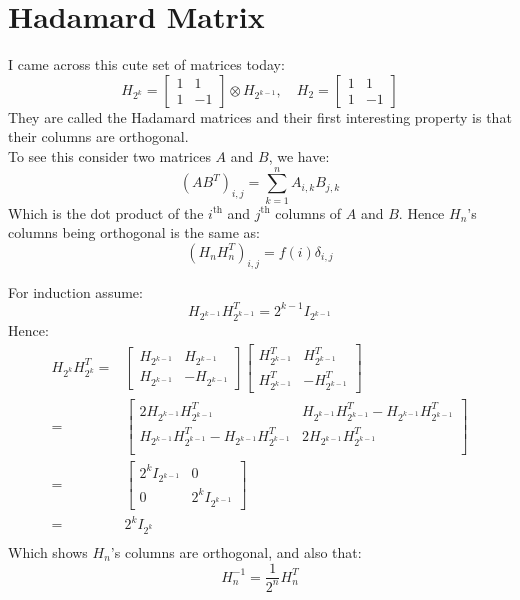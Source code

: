
\section{Hadamard Matrix}
I came across this cute set of matrices today:
\[H_{2^k} = \begin{bmatrix} 1&1\\1&-1\end{bmatrix}\otimes H_{2^{k-1}},\quad H_{2} = \begin{bmatrix} 1&1\\1&-1\end{bmatrix}\]
They are called the Hadamard matrices and their first interesting property is that their columns are orthogonal.
\\

To see this consider two matrices $A$ and $B$, we have:
\[(AB^T)_{i,j} = \sum_{k=1}^nA_{i,k}B_{j,k}\]
Which is the dot product of the $i^\text{th}$ and $j^\text{th}$ columns of $A$ and $B$.
Hence $H_n$'s columns being orthogonal is the same as:
\[(H_nH_n^T)_{i,j} = f(i)\delta_{i,j}\]

For induction assume:
\[H_{2^{k-1}}H_{2^{k-1}}^T=2^{k-1}I_{2^{k-1}}\]
Hence:
\begin{equation*}
\begin{aligned}
	H_{2^k}H_{2^k}^T =& \begin{bmatrix} H_{2^{k-1}}&H_{2^{k-1}}\\H_{2^{k-1}}&-H_{2^{k-1}}\end{bmatrix}
	\begin{bmatrix} H_{2^{k-1}}^T&H_{2^{k-1}}^T\\H_{2^{k-1}}^T&-H_{2^{k-1}}^T\end{bmatrix}\\
	=&\begin{bmatrix} 2H_{2^{k-1}}H_{2^{k-1}}^T&H_{2^{k-1}}H_{2^{k-1}}^T-H_{2^{k-1}}H_{2^{k-1}}^T\\
	H_{2^{k-1}}H_{2^{k-1}}^T-H_{2^{k-1}}H_{2^{k-1}}^T&2H_{2^{k-1}}H_{2^{k-1}}^T\\\end{bmatrix}\\
	=&\begin{bmatrix}2^kI_{2^{k-1}}&0\\0&2^kI_{2^{k-1}}\end{bmatrix} \\
	=&2^kI_{2^k} \\
\end{aligned}
\end{equation*}
Which shows $H_n$'s columns are orthogonal,
and also that:
\[H_n^{-1} = \frac{1}{2^n}H_n^T\]

